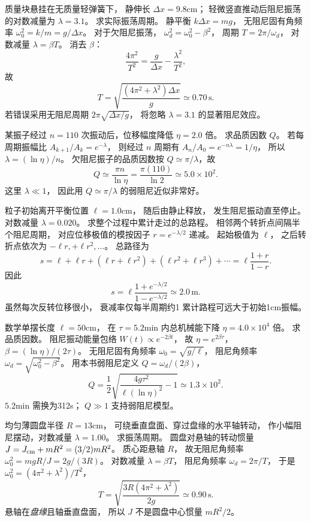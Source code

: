 质量块悬挂在无质量轻弹簧下，
静伸长
$\Delta x=9.8$cm；
轻微竖直推动后阻尼振荡的对数减量为
$\lambda=3.1$。
求实际振荡周期。
\exsolution
静平衡
$k\Delta x=mg$，
无阻尼固有角频率
$\omega_0^2=k/m=g/\Delta x$。
对于欠阻尼振荡，
$\omega_d^2=\omega_0^2-\beta^2$，
周期 $T=2\pi/\omega_d$，
对数减量
$\lambda=\beta T$。
消去 $\beta$：
\[
\frac{4\pi^2}{T^2}
=\frac g{\Delta x}-\frac{\lambda^2}{T^2},
\]
故
\[
\boxed{T=
\sqrt{\frac{(4\pi^2+\lambda^2)\Delta x}{g}}
\simeq0.70\,\mathrm s}.
\]
\excheck 若错误采用无阻尼周期
$2\pi\sqrt{\Delta x/g}$，
将忽略 $\lambda=3.1$ 的显著阻尼效应。

某振子经过
$n=110$ 次振动后，位移幅度降低
$\eta=2.0$ 倍。
求品质因数 $Q$。
\exsolution
若每周期振幅比
$A_{k+1}/A_k=e^{-\lambda}$，
则经过 $n$ 周期有
$A_n/A_0=e^{-n\lambda}=1/\eta$，
所以
$\lambda=(\ln\eta)/n$。
欠阻尼振子的品质因数按
$Q\simeq\pi/\lambda$，故
\[
\boxed{Q\simeq\frac{\pi n}{\ln\eta}
=\frac{\pi(110)}{\ln2}
\simeq5.0\times10^2}.
\]
\excheck 这里 $\lambda\ll1$，
因此用 $Q\simeq\pi/\lambda$ 的弱阻尼近似非常好。

粒子初始离开平衡位置 $\ell=1.0$cm，
随后由静止释放，
发生阻尼振动直至停止。
对数减量
$\lambda=0.020$。
求整个过程中累计走过的总路程。
\exsolution
相邻两个转折点间隔半个阻尼周期，
对应位移极值的模按因子
$r=e^{-\lambda/2}$ 递减。
起始极值为 $\ell$，
之后转折点依次为
$-\ell r,+\ell r^2,\ldots$。
总路径为
\[
s=\ell+\ell r+
(\ell r+\ell r^2)+(\ell r^2+\ell r^3)+\cdots
=\ell\frac{1+r}{1-r}.
\]
因此
\[
\boxed{s=\ell
\frac{1+e^{-\lambda/2}}{1-e^{-\lambda/2}}
\simeq2.0\,\mathrm m}.
\]
\excheck 虽然每次反转位移很小，
衰减率仅每半周期约1%
累计路程可远大于初始1cm振幅。

数学单摆长度 $\ell=50$cm，
在
$\tau=5.2$min 内总机械能下降
$\eta=4.0\times10^4$ 倍。
求品质因数。
\exsolution
阻尼振动能量包络
$W(t)\propto e^{-2\beta t}$，
故
$\eta=e^{2\beta\tau}$，
$\beta=(\ln\eta)/(2\tau)$。
无阻尼固有角频率
$\omega_0=\sqrt{g/\ell}$，
阻尼角频率
$\omega_d=\sqrt{\omega_0^2-\beta^2}$。
用本书弱阻尼定义
$Q=\omega_d/(2\beta)$，
\[
\boxed{Q=\frac12
\sqrt{\frac{4g\tau^2}{\ell(\ln\eta)^2}-1}
\simeq1.3\times10^2}.
\]
\excheck $5.2$min 需换为312s；
$Q\gg1$ 支持弱阻尼模型。

均匀薄圆盘半径
$R=13$cm，
可绕垂直盘面、穿过盘缘的水平轴转动，
作小幅阻尼摆动，对数减量
$\lambda=1.00$。
求振荡周期。
\exsolution
圆盘对悬轴的转动惯量
$J=J_{\rm cm}+mR^2=(3/2)mR^2$。
质心距悬轴 $R$，
故无阻尼角频率
$\omega_0^2=mgR/J=2g/(3R)$。
对数减量 $\lambda=\beta T$，
阻尼角频率
$\omega_d=2\pi/T$，
于是
$\omega_0^2=(4\pi^2+\lambda^2)/T^2$，
\[
\boxed{T=
\sqrt{\frac{3R(4\pi^2+\lambda^2)}{2g}}
\simeq0.90\,\mathrm s}.
\]
\excheck 悬轴在\emph{盘缘}且轴垂直盘面，
所以 $J$ 不是圆盘中心惯量 $mR^2/2$。

